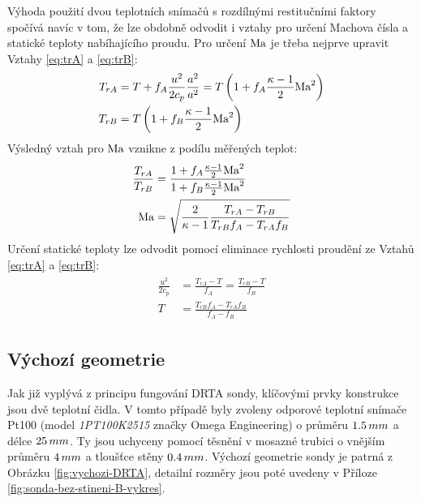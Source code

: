         Výhoda použití dvou teplotních snímačů s rozdílnými restitučními faktory spočívá navíc v tom, že lze obdobně odvodit i vztahy pro určení Machova čísla a statické teploty nabíhajícího proudu. Pro určení $\textrm{Ma}$ je třeba nejprve upravit Vztahy \ref{eq:trA} a \ref{eq:trB}:
        \begin{align}
            \begin{split}
                T_{rA} &= T + f_A \frac{u^2}{2 c_p} \frac{a^2}{a^2} = T \left( 1 + f_A \frac{\kappa - 1}{2} \textrm{Ma} ^2 \right) \\
                T_{rB} &=  T \left( 1 + f_B \frac{\kappa - 1}{2} \textrm{Ma} ^2 \right)
            \end{split}
        \end{align}
        \noindent Výsledný vztah pro $\textrm{Ma}$ vznikne z podílu měřených teplot:
        \begin{align}
            \begin{split}
                \frac{T_{rA}}{T_{rB}} &= \frac{1 + f_A \frac{\kappa - 1}{2} \textrm{Ma} ^2}{1 + f_B \frac{\kappa - 1}{2} \textrm{Ma} ^2} \\
                \textrm{Ma} &= \sqrt{\frac{2}{\kappa - 1} \frac{T_{rA}-T_{rB}}{T_{rB} f_A - T_{rA} f_B}}
            \end{split}
        \end{align}
        \noindent Určení statické teploty lze odvodit pomocí eliminace rychlosti proudění ze Vztahů \ref{eq:trA} a \ref{eq:trB}:
        \begin{align}
            \begin{split}
                \frac{u^2}{2 c_p} &= \frac{T_{rA} - T}{f_A} = \frac{T_{rB} - T}{f_B} \\
                T &= \frac{T_{rB} f_A - T_{rA} f_B}{f_A - f_B}
            \end{split}
        \end{align}

    \subsection{Výchozí geometrie}
        Jak již vyplývá z principu fungování DRTA sondy, klíčovými prvky konstrukce jsou dvě teplotní čidla. V tomto případě byly zvoleny odporové teplotní snímače Pt100 (model \textit{1PT100K2515} značky Omega Engineering) o průměru $1.5 \, mm$ a délce $25 \, mm$. Ty jsou uchyceny pomocí těsnění v mosazné trubici o vnějším průměru $4 \, mm$ a tloušťce stěny $0.4 \, mm$. Výchozí geometrie sondy je patrná z Obrázku \ref{fig:vychozi-DRTA}, detailní rozměry jsou poté uvedeny v Příloze \ref{fig:sonda-bez-stineni-B-vykres}.

